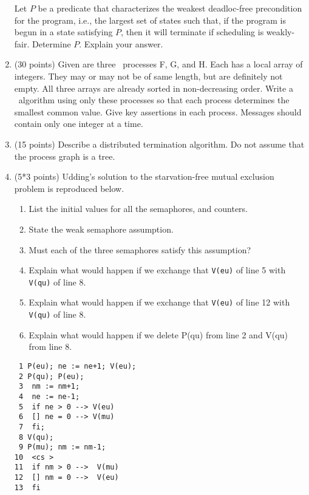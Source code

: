 \begin{enumerate}
Let $P$ be a predicate that characterizes the weakest deadloc-free
precondition for the program, i.e., the largest set of states such
that, if the program is begun in a state satisfying $P$, then it will
terminate if scheduling is weakly-fair.  Determine $P$.  Explain your
answer.


\item (30 points)
Given are three \CSP\ processes F, G, and H.  Each has a local array
of integers.  They may or may not be of same length, but are
definitely not empty.  All three arrays are already sorted in
non-decreasing order.  Write a \CSP\ algorithm using only these
processes so that each process determines the smallest common value.
Give key assertions in each process.  Messages should contain only one
integer at a time.


\item (15 points)
Describe a distributed termination algorithm.  Do not assume that the
process graph is a tree.

\item (5*3 points)
Udding's solution to the starvation-free mutual exclusion problem is
reproduced below.
\begin{enumerate}
\item List the initial values for all the semaphores, and counters.
\item State the weak semaphore assumption.  
\item Must each of the three semaphores satisfy this assumption?  
\item Explain what would happen if we exchange that {\tt V(eu)} of line 5
with {\tt V(qu)} of line 8.  \item Explain what would happen if we
exchange that {\tt V(eu)} of line 12 with {\tt V(qu)} of line 8.
\item Explain what would happen if we delete P(qu) from line 2 and
V(qu) from line 8.
\end{enumerate}

\begin{verbatim}
 1 P(eu); ne := ne+1; V(eu);
 2 P(qu); P(eu);	    
 3	nm := nm+1;	    
 4	ne := ne-1;	    
 5	if ne > 0 --> V(eu) 
 6	[] ne = 0 --> V(mu) 
 7	fi;		    
 8 V(qu);		    
 9 P(mu); nm := nm-1;	    
10	<cs >		    
11	if nm > 0 -->  V(mu)
12	[] nm = 0 -->  V(eu)
13	fi		    
\end{verbatim}

\end{enumerate}

